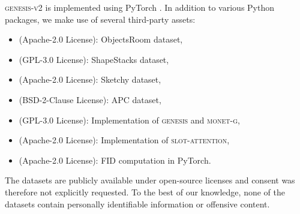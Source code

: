 \documentclass{article}
\begin{document}
\textsc{genesis-v2} is implemented using PyTorch \cite{paszke2017automatic}.
In addition to various Python packages, we make use of several third-party assets:
\begin{itemize}
    \item \citet{multiobjectdatasets19} (Apache-2.0 License): ObjectsRoom dataset,
    \item \citet{groth2018shapestacks} (GPL-3.0 License): ShapeStacks dataset,
    \item \citet{cabi2019scaling} (Apache-2.0 License): Sketchy dataset,
    \item \citet{zeng2016multi} (BSD-2-Clause License): APC dataset,
    \item \citet{engelcke2020genesis,engelcke2020reconstruction} (GPL-3.0 License): Implementation of \textsc{genesis} and \textsc{monet-g},
    \item \citet{locatello2020object} (Apache-2.0 License): Implementation of \textsc{slot-attention},
    \item \citet{Seitzer2020FID} (Apache-2.0 License): FID computation in PyTorch.
\end{itemize}
The datasets are publicly available under open-source licenses and consent was therefore not explicitly requested.
To the best of our knowledge, none of the datasets contain personally identifiable information or offensive content.
\end{document}
